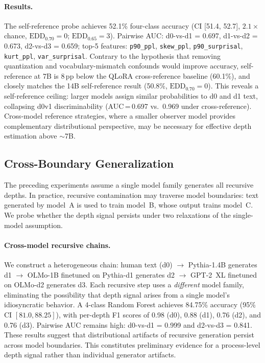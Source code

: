 \paragraph{Results.}
The self-reference probe achieves 52.1\% four-class accuracy (CI [51.4, 52.7], $2.1{\times}$ chance, $\mathrm{EDD}_{0.70}{=}0$; $\mathrm{EDD}_{0.65}{=}3$).
Pairwise AUC: d0-vs-d1 = 0.697, d1-vs-d2 = 0.673, d2-vs-d3 = 0.659; top-5 features: \texttt{p90\_ppl}, \texttt{skew\_ppl}, \texttt{p90\_surprisal}, \texttt{kurt\_ppl}, \texttt{var\_surprisal}.
Contrary to the hypothesis that removing quantization and vocabulary-mismatch confounds would improve accuracy, self-reference at 7B is 8\,pp below the QLoRA cross-reference baseline (60.1\%), and closely matches the 14B self-reference result (50.8\%, $\mathrm{EDD}_{0.70}{=}0$).
This reveals a self-reference ceiling: larger models assign similar probabilities to d0 and d1 text, collapsing d0v1 discriminability (AUC\,=\,0.697 vs.\ 0.969 under cross-reference).
Cross-model reference strategies, where a smaller observer model provides complementary distributional perspective, may be necessary for effective depth estimation above ${\sim}$7B.

\subsection{Cross-Boundary Generalization}
\label{app:cross_boundary}

The preceding experiments assume a single model family generates all recursive depths.
In practice, recursive contamination may traverse model boundaries: text generated by model~A is used to train model~B, whose output trains model~C.
We probe whether the depth signal persists under two relaxations of the single-model assumption.

\paragraph{Cross-model recursive chains.}
We construct a heterogeneous chain: human text (d0) $\to$ Pythia-1.4B generates d1 $\to$ OLMo-1B finetuned on Pythia-d1 generates d2 $\to$ GPT-2~XL finetuned on OLMo-d2 generates d3.
Each recursive step uses a \emph{different} model family, eliminating the possibility that depth signal arises from a single model's idiosyncratic behavior.
A 4-class Random Forest achieves 84.75\% accuracy (95\% CI $[81.0, 88.25]$), with per-depth F1 scores of 0.98 (d0), 0.88 (d1), 0.76 (d2), and 0.76 (d3).
Pairwise AUC remains high: d0-vs-d1 = 0.999 and d2-vs-d3 = 0.841.
These results suggest that distributional artifacts of recursive generation persist across model boundaries. This constitutes preliminary evidence for a process-level depth signal rather than individual generator artifacts.

